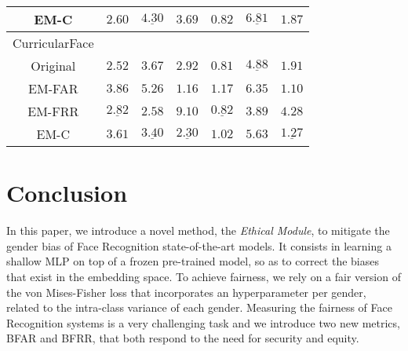 \documentclass[nohyperref]{article}
\theoremstyle{plain}
\theoremstyle{definition}
\theoremstyle{remark}
\begin{document}
\begin{table*}
\begin{center}
\begin{small}
\begin{sc}
\begin{tabular}{ c | ccc | ccc}
 EM-C & $2.60$ & $\underline{4.30}$ & $3.69$ & $0.82$ & $\underline{6.81}$ & $1.87$ \\ 
 \midrule \midrule
  CurricularFace&&&&&&\\
\midrule
 Original  & $\mathbf{2.52}$ & $3.67$ & $2.92$ & $\mathbf{0.81}$  & $\underline{4.88}$ & $1.91$  \\
   EM-FAR & $3.86$ & $5.26$ & $\mathbf{1.16}$  & $1.17$ & $6.35$  & $\mathbf{1.10}$  \\
 EM-FRR & $\underline{2.82}$ & $\mathbf{2.58}$ & $9.10$ & $\underline{0.82}$ & $\mathbf{3.89}$  & $4.28$ \\
 EM-C & $3.61$ & $\underline{3.40}$ & $\underline{2.30}$ & $1.02$ & $5.63$ & $\underline{1.27}$  \\ \bottomrule
\end{tabular}
\label{tab:LFW_mobilefacenet}
\end{sc}
\end{small}
\end{center}
\vskip -0.1in
\end{table*}












\section{Conclusion}

In this paper, we introduce a novel method, the {\it Ethical Module}, to mitigate the gender bias of Face Recognition state-of-the-art models. It consists in learning a shallow MLP on top of a frozen pre-trained model, so as to correct the biases that exist in the embedding space. To achieve fairness, we rely on a fair version of the von Mises-Fisher loss that incorporates an hyperparameter per gender, related to the intra-class variance of each gender. Measuring the fairness of Face Recognition systems is a very challenging task and we introduce two new metrics, BFAR and BFRR, that both respond to the need for security and equity. 
\end{document}
